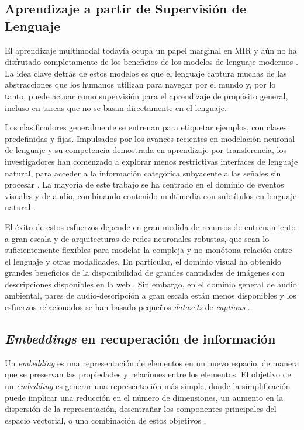 \subsection{Aprendizaje a partir de Supervisión de Lenguaje}
\label{subsec:learning_lang_superv}
El aprendizaje multimodal todavía ocupa un papel marginal en MIR y aún no ha disfrutado completamente de los beneficios de los modelos de lenguaje modernos \cite{Manco2022ContrastiveAL}. La idea clave detrás de estos modelos es que el lenguaje captura muchas de las abstracciones que los humanos utilizan para navegar por el mundo y, por lo tanto, puede actuar como supervisión para el aprendizaje de propósito general, incluso en tareas que no se basan directamente en el lenguaje.

Los clasificadores generalmente se entrenan para etiquetar ejemplos, con clases predefinidas y fijas. Impulsados por los avances recientes en modelación neuronal de lenguaje y su competencia demostrada en aprendizaje por transferencia, los investigadores han comenzado a explorar menos restrictivas interfaces de lenguaje natural, para acceder a la información categórica subyacente a las señales sin procesar \cite{Huang2022MuLanAJ}. La mayoría de este trabajo se ha centrado en el dominio de eventos visuales y de audio, combinando contenido multimedia con subtítulos en lenguaje natural \cite{Koepke2021AudioRW, Jia2021ScalingUV, Radford2021LearningTV, Nagrani2022LearningAM}.

El éxito de estos esfuerzos depende en gran medida de recursos de entrenamiento a gran escala y de arquitecturas de redes neuronales robustas, que sean lo suficientemente flexibles para modelar la compleja y no monótona relación entre el lenguaje y otras modalidades. En particular, el dominio visual ha obtenido grandes beneficios de la disponibilidad de grandes cantidades de imágenes con descripciones disponibles en la web \cite{Jia2021ScalingUV}. Sin embargo, en el dominio general de audio ambiental, pares de audio-descripción a gran escala están menos disponibles y los esfuerzos relacionados se han basado pequeños \textit{datasets} de \textit{captions} \cite{Drossos2019ClothoAA, Kim2019AudioCapsGC}.
\subsection{\textit{Embeddings} en recuperación de información}
\label{subsec:semantic_embedd}
Un \textit{embedding} es una representación de elementos en un nuevo espacio, de manera que se preservan las propiedades y relaciones entre los elementos. El objetivo de un \textit{embedding} es generar una representación más simple, donde la simplificación puede implicar una reducción en el número de dimensiones, un aumento en la dispersión de la representación, desentrañar los componentes principales del espacio vectorial, o una combinación de estos objetivos \cite{Mitra2017NeuralMF}.

